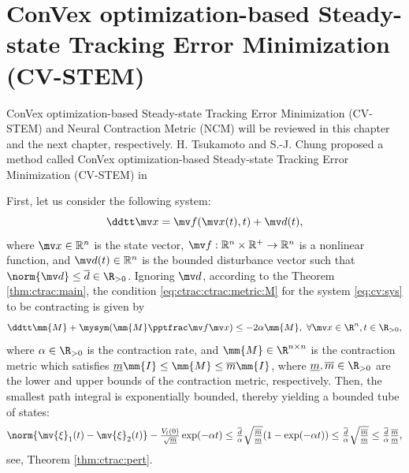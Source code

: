 \section{ConVex optimization-based Steady-state Tracking Error Minimization (CV-STEM)}\label{chap:CV-STEM}

ConVex optimization-based Steady-state Tracking Error Minimization (CV-STEM) and Neural Contraction Metric (NCM) will be reviewed in this chapter and the next chapter, respectively.
H. Tsukamoto and S.-J. Chung proposed a method called ConVex optimization-based Steady-state Tracking Error Minimization (CV-STEM) in \cite{Tsukamoto:2021ae} 

First, let us consider the following system:
\begin{equation}
   \ddtt\bdx 
   =
   \bdf(\bdx(t), t)
   + 
   \bdd(t)
   ,
   \label{eq:cv:sys}
\end{equation}
where $\bdx \in \mathbb{R}^n$ is the state vector, $\bdf: \mathbb{R}^n \times \mathbb{R}^+ \to \mathbb{R}^n$ is a nonlinear function, and $\bdd(t) \in \mathbb{R}^n$ is the bounded disturbance vector such that $\norm{\bdd} \leq \overline{d}\in\R_{>0}$.
Ignoring $\bdd$, according to the Theorem \ref{thm:ctrac:main}, the condition \eqref{eq:ctrac:ctrac:metric:M} for the system \eqref{eq:cv:sys} to be contracting is given by
\begin{equation}
    \ddtt\mm{M}
    +
    \mysym(\mm{M}\tpfpx)
    \le
    -2\alpha\mm{M}
    ,
    \ 
    \forall \bdx \in \R^n, t\in\R_{>0}
    ,
    \label{eq:cv:ctrac:condition}
\end{equation}
where $\alpha \in \R_{>0}$ is the contraction rate, and $\mm{M} \in \R^{n\times n}$ is the contraction metric which satisfies $\underline{m}\mm{I} \leq \mm{M} \leq \overline{m}\mm{I}$, where $\underline{m}, \overline{m} \in \R_{>0}$ are the lower and upper bounds of the contraction metric, respectively.
Then, the smallest path integral is exponentially bounded, thereby yielding a bounded tube of states:
\begin{equation}
    \norm{\mv{\xi}_1(t)-\mv{\xi}_2(t)}
    -
    \tfrac{V_l(0)}{\sqrt{\underline{m}}}
    \exp(-\alpha t)
    \le 
    \tfrac{\overline{d}}{\alpha}
    \sqrt{
        \tfrac{\overline{m}}{\underline{m}}
    }
    (1-\exp(-\alpha t))
    \le
    \tfrac{\overline{d}}{\alpha}
    \sqrt{
        \tfrac{\overline{m}}{\underline{m}} 
    }
    \le
    \tfrac{\overline{d}}{\alpha}
    \tfrac{\overline{m}}{\underline{m}}
    ,
\end{equation}
\ie see, Theorem \ref{thm:ctrac:pert}.

